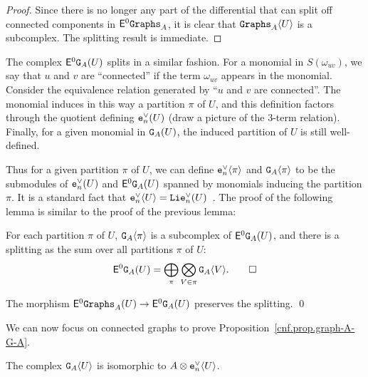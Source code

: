 \begin{proof}
  Since there is no longer any part of the differential that can split off connected components in $\mathsf{E}^{0} \mathtt{Graphs}_{A}$, it is clear that $\mathtt{Graphs}_{A}\langle U \rangle$ is a subcomplex.
  The splitting result is immediate.
\end{proof}

The complex $\mathsf{E}^{0} \mathtt{G}_{A}(U)$ splits in a similar fashion.
For a monomial in $S(\omega_{uv})$, we say that $u$ and $v$ are ``connected'' if the term $\omega_{uv}$ appears in the monomial.
Consider the equivalence relation generated by ``$u$ and $v$ are connected''.
The monomial induces in this way a partition $\pi$ of $U$, and this definition factors through the quotient defining $\mathtt{e}_{n}^{\vee}(U)$ (draw a picture of the $3$-term relation).
Finally, for a given monomial in $\mathtt{G}_{A}(U)$, the induced partition of $U$ is still well-defined.

Thus for a given partition $\pi$ of $U$, we can define $\mathtt{e}_{n}^{\vee} \langle \pi\rangle$ and $\mathtt{G}_{A}\langle \pi \rangle$ to be the submodules of $\mathtt{e}_{n}^{\vee}(U)$ and $\mathsf{E}^{0} \mathtt{G}_{A}(U)$ spanned by monomials inducing the partition $\pi$.
It is a standard fact that $\mathtt{e}_{n}^{\vee} \langle U \rangle = \mathtt{Lie}_{n}^{\vee}(U)$~\cite{Sinh2007}.
The proof of the following lemma is similar to the proof of the previous lemma:

\begin{lemma}
  \label{cnf.lemma.partition}
  For each partition $\pi$ of $U$, $\mathtt{G}_{A} \langle \pi \rangle$ is a subcomplex of $\mathsf{E}^{0} \mathtt{G}_{A}(U)$, and there is a splitting as the sum over all partitions $\pi$ of $U$:
  \[ \mathsf{E}^{0} \mathtt{G}_{A}(U) = \bigoplus_{\pi} \bigotimes_{V \in \pi} \mathtt{G}_{A}\langle V \rangle.
    \qed \]
\end{lemma}

\begin{lemma}
  The morphism $\mathsf{E}^{0} \mathtt{Graphs}_{A}(U) \to \mathsf{E}^{0} \mathtt{G}_{A}(U)$ preserves the splitting.
  \qed
\end{lemma}

We can now focus on connected graphs to prove Proposition~\ref{cnf.prop.graph-A-G-A}.

\begin{lemma}
  The complex $\mathtt{G}_{A} \langle U \rangle$ is isomorphic to $A \otimes \mathtt{e}_{n}^{\vee} \langle U \rangle$.
\end{lemma}

